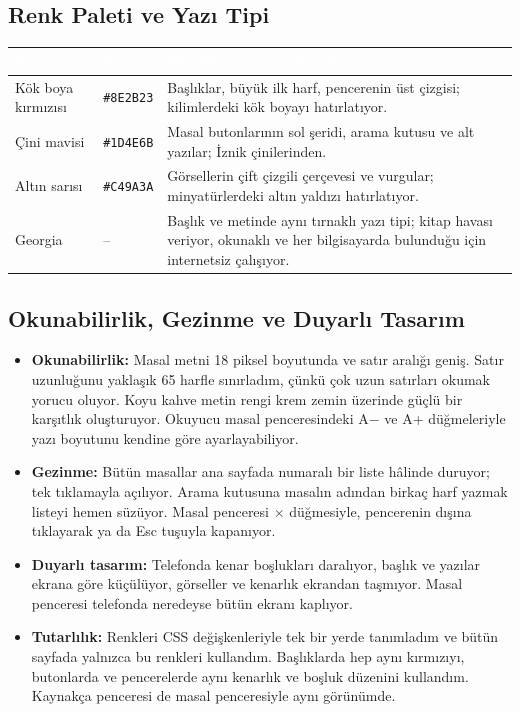 \documentclass[12pt,a4paper]{article}
\begin{document}
\subsection{Renk Paleti ve Yazı Tipi}
\begin{center}
\begin{tabular}{@{}llp{6.4cm}@{}}
\toprule
\rowcolor{ana}\textcolor{white}{\textbf{Ad}} & \textcolor{white}{\textbf{Kod}} & \textcolor{white}{\textbf{Nerede / neden kullandınız?}} \\
\midrule
\relax Kök boya kırmızısı & \texttt{\#8E2B23} & Başlıklar, büyük ilk harf, pencerenin üst çizgisi; kilimlerdeki kök boyayı hatırlatıyor. \\
\relax Çini mavisi & \texttt{\#1D4E6B} & Masal butonlarının sol şeridi, arama kutusu ve alt yazılar; İznik çinilerinden. \\
\relax Altın sarısı & \texttt{\#C49A3A} & Görsellerin çift çizgili çerçevesi ve vurgular; minyatürlerdeki altın yaldızı hatırlatıyor. \\
\relax Georgia & -- & Başlık ve metinde aynı tırnaklı yazı tipi; kitap havası veriyor, okunaklı ve her bilgisayarda bulunduğu için internetsiz çalışıyor. \\
\bottomrule
\end{tabular}
\end{center}

\subsection{Okunabilirlik, Gezinme ve Duyarlı Tasarım}
\begin{itemize}
  \item \textbf{Okunabilirlik:} Masal metni 18 piksel boyutunda ve satır aralığı geniş. Satır uzunluğunu yaklaşık 65 harfle sınırladım, çünkü çok uzun satırları okumak yorucu oluyor. Koyu kahve metin rengi krem zemin üzerinde güçlü bir karşıtlık oluşturuyor. Okuyucu masal penceresindeki A$-$ ve A+ düğmeleriyle yazı boyutunu kendine göre ayarlayabiliyor.
  \item \textbf{Gezinme:} Bütün masallar ana sayfada numaralı bir liste hâlinde duruyor; tek tıklamayla açılıyor. Arama kutusuna masalın adından birkaç harf yazmak listeyi hemen süzüyor. Masal penceresi $\times$ düğmesiyle, pencerenin dışına tıklayarak ya da Esc tuşuyla kapanıyor.
  \item \textbf{Duyarlı tasarım:} Telefonda kenar boşlukları daralıyor, başlık ve yazılar ekrana göre küçülüyor, görseller ve kenarlık ekrandan taşmıyor. Masal penceresi telefonda neredeyse bütün ekranı kaplıyor.
  \item \textbf{Tutarlılık:} Renkleri CSS değişkenleriyle tek bir yerde tanımladım ve bütün sayfada yalnızca bu renkleri kullandım. Başlıklarda hep aynı kırmızıyı, butonlarda ve pencerelerde aynı kenarlık ve boşluk düzenini kullandım. Kaynakça penceresi de masal penceresiyle aynı görünümde.
\end{itemize}
\end{document}
